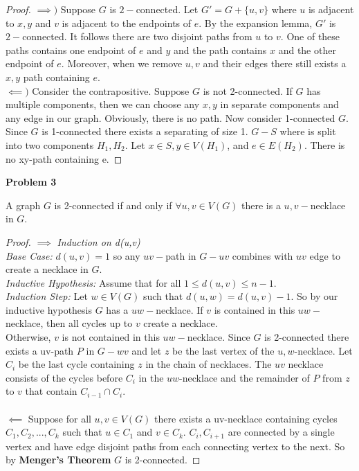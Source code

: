 \documentclass{article}
\newenvironment{claim}[2][Claim]{\begin{trivlist}
		\item[\hskip \labelsep {\bfseries #1}\hskip \labelsep {\bfseries #2}]}{\end{trivlist}}
\begin{document}
\begin{proof}
$\implies)$ Suppose $G$ is $2-$connected. Let $G'= G + \{u,v\}$ where $u$ is adjacent to $x,y$ and $v$ is adjacent to the endpoints of $e$. By the expansion lemma, $G'$ is $2-$connected. It follows there are two disjoint paths from $u$ to $v$. One of these paths contains one endpoint of $e$ and $y$ and the path contains $x$ and the other endpoint of $e$. Moreover, when we remove $u,v$ and their edges there still exists a $x,y$ path containing $e$.\\
$\impliedby)$ Consider the contrapositive. Suppose $G$ is not 2-connected. If $G$ has multiple components, then we can choose any $x,y$ in separate components and any edge in our graph. Obviously, there is no path. Now consider 1-connected $G$. Since $G$ is 1-connected there exists a separating of size 1. $G - S$ where is split into two components $H_1, H_2$. Let $x \in S, y \in V(H_1)$, and $e \in E(H_2)$. There is no xy-path containing e.
\end{proof}
\newpage
\noindent \textbf{Problem 3}
\begin{claim}{}
A graph $G$ is 2-connected if and only if $\forall u,v \in V(G)$ there is a $u,v-$necklace in $G$.
\end{claim}
\begin{proof}
$\implies$
\textit{Induction on d(u,v)}\\
\textit{Base Case: }$d(u,v) = 1$ so any $uv-$path in $G - uv$ combines with $uv$ edge to create a necklace in $G$.\\
\textit{Inductive Hypothesis: } Assume that for all $1 \leq d(u,v) \leq n - 1$.\\
\textit{Induction Step: }Let $w \in V(G)$ such that $d(u, w) = d(u,v) - 1$. So by our inductive hypothesis $G$ has a $uw-$necklace.
If $v$ is contained in this $uw-$ necklace, then all cycles up to $v$ create a necklace.\\

Otherwise, $v$ is not contained in this $uw-$necklace. Since $G$ is 2-connected there exists a uv-path $P$ in $G - wv$ and let $z$ be the last vertex of the $u,w$-necklace. Let $C_i$ be the last cycle containing $z$ in the chain of necklaces. The $uv$ necklace consists of the cycles before $C_i$ in the $uw$-necklace and the remainder of $P$ from $z$ to $v$ that contain $C_{i - 1} \cap C_i$. 
\\\\$\impliedby$ Suppose for all $u,v \in V(G)$ there exists a uv-necklace containing cycles $C_1, C_2, ..., C_k$ such that $u \in C_1$ and $v \in C_k$. $C_i, C_{i + 1}$ are connected by a single vertex and have edge disjoint paths from each connecting vertex to the next. So by \textbf{Menger's Theorem} $G$ is 2-connected. 
\end{proof}
\end{document}
